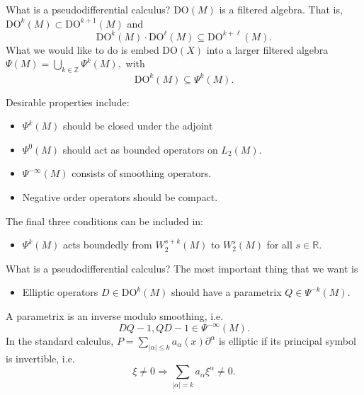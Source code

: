 \documentclass{beamer}
\numberwithin{equation}{section}
\theoremstyle{plain}
\theoremstyle{plain}
\theoremstyle{definition}
\theoremstyle{plain}
\theoremstyle{plain}
\theoremstyle{definition}
\newcommand{\Rl}{\mathbb{R}}
\newcommand{\Itgr}{\mathbb{Z}}
\begin{document}
\begin{frame}{What is a pseudodifferential calculus?}
  $\mathrm{DO}(M)$ is a filtered algebra. That is, $\mathrm{DO}^{k}(M)\subset \mathrm{DO}^{k+1}(M)$ and
  \[
    \mathrm{DO}^k(M)\cdot \mathrm{DO}^\ell(M) \subseteq \mathrm{DO}^{k+\ell}(M).
  \]
  What we would like to do is embed $\mathrm{DO}(X)$ into a larger filtered algebra $\Psi(M)=\bigcup_{k\in \Itgr} \Psi^k(M),$ with
  \[
    \mathrm{DO}^k(M) \subseteq \Psi^k(M).
  \]
\end{frame}

\begin{frame}
  Desirable properties include:
  \begin{itemize}
    \item{} $\Psi^k(M)$ should be closed under the adjoint
    \item{} $\Psi^0(M)$ should act as bounded operators on $L_2(M).$
    \item{} $\Psi^{-\infty}(M)$ consists of smoothing operators.
    \item{} Negative order operators should be compact.
  \end{itemize}\pause
  The final three conditions can be included in:
  \begin{itemize}
    \item{} $\Psi^k(M)$ acts boundedly from $W^{s+k}_2(M)$ to $W^{s}_2(M)$ for all $s\in \Rl.$
  \end{itemize}
\end{frame}

\begin{frame}{What is a pseudodifferential calculus?}
  The most important thing that we want is 
  \begin{itemize}
    \item{} Elliptic operators $D\in \mathrm{DO}^k(M)$ should have a parametrix $Q \in \Psi^{-k}(M).$
  \end{itemize}
  A parametrix is an inverse modulo smoothing, i.e.
  \[
    DQ-1,QD-1 \in \Psi^{-\infty}(M).
  \]
  \pause
  In the standard calculus, $P=\sum_{|\alpha|\leq k} a_{\alpha}(x)\partial^{\alpha}$ is elliptic if its principal symbol is invertible, i.e.
  \[
    \xi\neq 0\Rightarrow \sum_{|\alpha|=k} a_{\alpha}\xi^{\alpha} \neq 0.
  \]
\end{frame}
\end{document}
